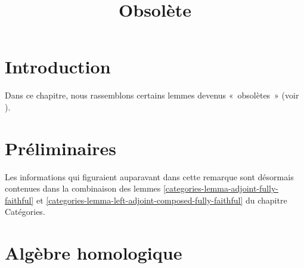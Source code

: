 

%


\title{Obsolète}

\maketitle

\label{section-phantom}

\tableofcontents




\section{Introduction}
\label{section-introduction}

\noindent
Dans ce chapitre, nous rassemblons certains lemmes devenus «~obsolètes~»
(voir \cite{Miller}).


\section{Préliminaires}
\label{section-preliminaries}

\begin{remark}
\label{remark-composition-of-adjoints-isomorphic-to-identity}
Les informations qui figuraient auparavant dans cette remarque sont désormais
contenues dans la combinaison des lemmes \ref{categories-lemma-adjoint-fully-faithful}
et \ref{categories-lemma-left-adjoint-composed-fully-faithful} du chapitre
Catégories.
\end{remark}


\section{Algèbre homologique}
\label{section-homological-algebra}

